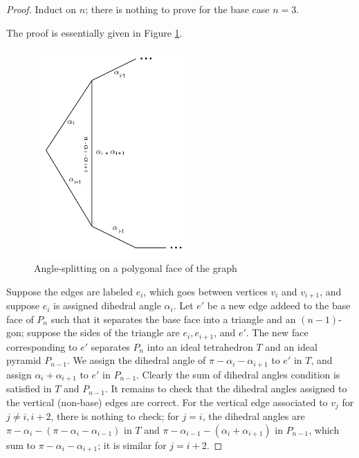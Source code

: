 \documentclass[11pt]{amsart}
\theoremstyle{plain}
\theoremstyle{definition}
\begin{document}
\begin{proof}
Induct on $n$; there is nothing to prove for the base case $n=3$.

The proof is essentially given in Figure \ref{f:ideal_pyramid_arg}.

\begin{figure}
\includegraphics[height=8cm]{more_pictures/angle_split.png}
\caption{Angle-splitting on a polygonal face of the graph}
\label{f:ideal_pyramid_arg}
\end{figure}


Suppose the edges are labeled $e_i$,
which goes between vertices $v_i$ and $v_{i+1}$,
and suppose $e_i$ is assigned dihedral angle $\alpha_i$.
Let $e'$ be a new edge addeed to the base face of $P_n$
such that it separates the base face into a triangle and
an $(n-1)$-gon;
suppose the sides of the triangle are
$e_i, e_{i+1}$, and $e'$.
The new face corresponding to $e'$ separates $P_n$ into
an ideal tetrahedron $T$ and an ideal pyramid $P_{n-1}$.
We assign the dihedral angle of $\pi - \alpha_i - \alpha_{i+1}$
to $e'$ in $T$, and assign $\alpha_i + \alpha_{i+1}$ to $e'$ in $P_{n-1}$.
Clearly the sum of dihedral angles condition is satisfied
in $T$ and $P_{n-1}$.
	It remains to check that the dihedral angles assigned to the vertical (non-base)
	edges are correct.
For the vertical edge associated to $v_j$ for $j \neq i, i+2$,
there is nothing to check;
for $j = i$, the dihedral angles are
$\pi - \alpha_i - (\pi - \alpha_i - \alpha_{i-1})$
in $T$ and $\pi - \alpha_{i-1} - (\alpha_i + \alpha_{i+1})$ in $P_{n-1}$,
which sum to $\pi - \alpha_i - \alpha_{i+1}$;
it is similar for $j = i+2$.

\end{proof}
\end{document}
